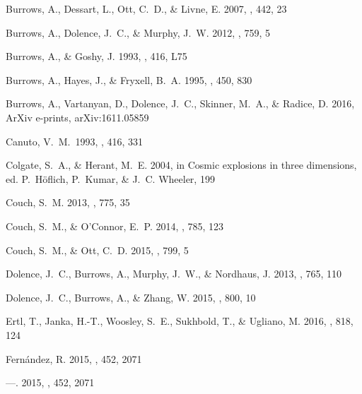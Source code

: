 \documentclass[twocolumn]{aastex6}
\begin{document}
\begin{thebibliography}{}
{Burrows}, A., {Dessart}, L., {Ott}, C.~D., \& {Livne}, E. 2007, \physrep, 442,
  23

{Burrows}, A., {Dolence}, J.~C., \& {Murphy}, J.~W. 2012, \apj, 759, 5

{Burrows}, A., \& {Goshy}, J. 1993, \apjl, 416, L75

{Burrows}, A., {Hayes}, J., \& {Fryxell}, B.~A. 1995, \apj, 450, 830

{Burrows}, A., {Vartanyan}, D., {Dolence}, J.~C., {Skinner}, M.~A., \&
  {Radice}, D. 2016, ArXiv e-prints, arXiv:1611.05859

 Canuto, V.~M.\ 1993, \apj, 416, 331 

{Colgate}, S.~A., \& {Herant}, M.~E. 2004, in Cosmic explosions in three
  dimensions, ed. P.~{H{\"o}flich}, P.~{Kumar}, \& J.~C. {Wheeler}, 199

{Couch}, S.~M. 2013, \apj, 775, 35

{Couch}, S.~M., \& {O'Connor}, E.~P. 2014, \apj, 785, 123

{Couch}, S.~M., \& {Ott}, C.~D. 2015, \apj, 799, 5

{Dolence}, J.~C., {Burrows}, A., {Murphy}, J.~W., \& {Nordhaus}, J. 2013, \apj,
  765, 110

{Dolence}, J.~C., {Burrows}, A., \& {Zhang}, W. 2015, \apj, 800, 10

{Ertl}, T., {Janka}, H.-T., {Woosley}, S.~E., {Sukhbold}, T., \& {Ugliano}, M.
  2016, \apj, 818, 124

{Fern{\'a}ndez}, R. 2015{}, \mnras, 452, 2071

---. 2015{}, \mnras, 452, 2071


\end{thebibliography}
\end{document}
